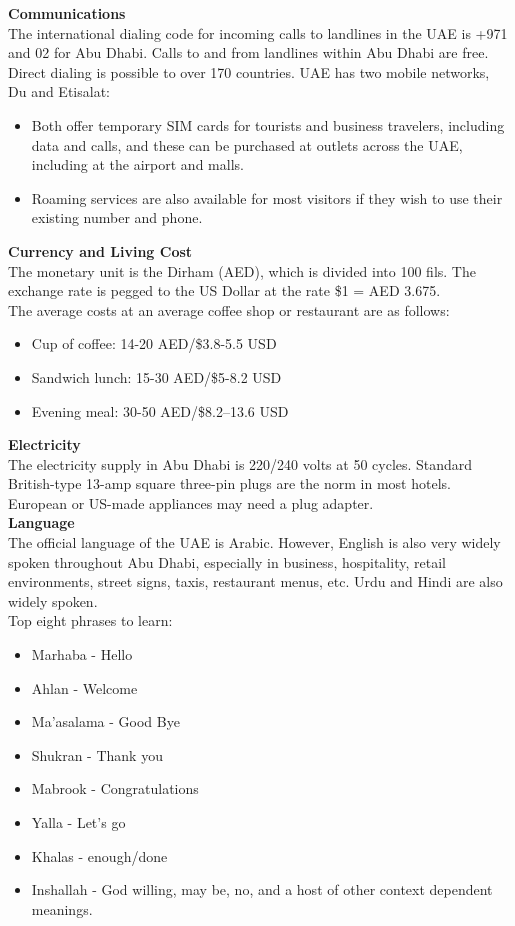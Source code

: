{\large \textbf{Communications}}\\
The international dialing code for incoming calls to landlines in the UAE is +971 and 02 for Abu Dhabi. 
Calls to and from landlines within Abu Dhabi are free. Direct dialing is possible to over 170 countries. 
UAE has two mobile networks, Du and Etisalat:
\begin{itemize}
    \itemsep-0.5em
    \item Both offer temporary SIM cards for tourists and business travelers, including data and calls, and these can be purchased at outlets across the UAE, including at the airport and malls.
    \item Roaming services are also available for most visitors if they wish to use their existing number and phone.
\end{itemize}

{\large \textbf{Currency and Living Cost}}\\
The monetary unit is the Dirham (AED), which is divided into 100 fils. The exchange rate is pegged to the US Dollar at the rate \$1 = AED 3.675.\\
The average costs at an average coffee shop or restaurant are as follows:
\begin{itemize}
    \itemsep-0.5em
    \item Cup of coffee: 14-20 AED/\$3.8-5.5 USD
    \item Sandwich lunch: 15-30 AED/\$5-8.2 USD
    \item Evening meal: 30-50 AED/\$8.2–13.6 USD
\end{itemize}

{\large \textbf{Electricity}}\\
The electricity supply in Abu Dhabi is 220/240 volts at 50 cycles.
Standard British-type 13-amp square three-pin plugs are the norm in most hotels. 
European or US-made appliances may need a plug adapter.\\

{\large \textbf{Language}}\\
The official language of the UAE is Arabic. However, English is also very widely spoken throughout Abu Dhabi, 
especially in business, hospitality, retail environments, street signs, taxis, restaurant menus, etc.
Urdu and Hindi are also widely spoken.\\
Top eight phrases to learn:
\begin{itemize}
    \itemsep-0.5em
    \item Marhaba - Hello
    \item Ahlan - Welcome
    \item Ma’asalama - Good Bye
    \item Shukran - Thank you
    \item Mabrook - Congratulations
    \item Yalla - Let’s go
    \item Khalas - enough/done
    \item Inshallah - God willing, may be, no, and a host of other context dependent meanings.
\end{itemize}

